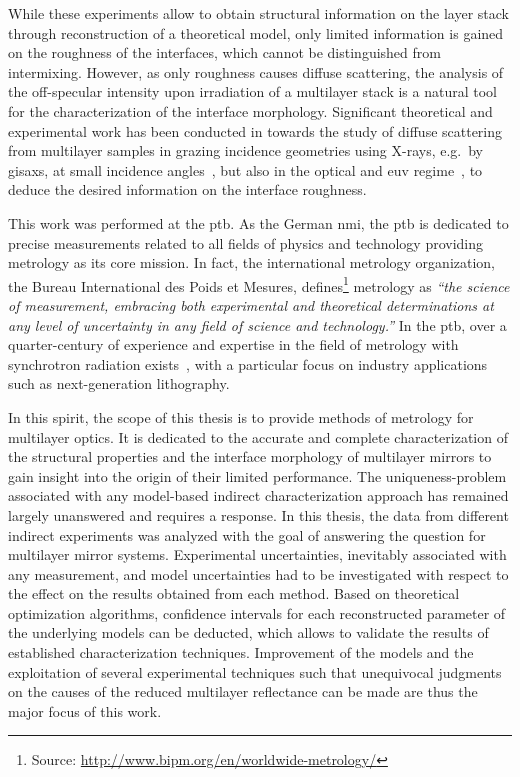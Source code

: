 While these experiments allow to obtain structural information on the layer
stack through reconstruction of a theoretical model, only limited information is
gained on the roughness of the interfaces, which cannot be distinguished from
intermixing.
However, as only roughness causes diffuse scattering, the analysis of the
off-specular intensity upon irradiation of a multilayer stack is a natural tool
for the characterization of the interface morphology.
Significant theoretical and experimental work has been conducted in towards the
study of diffuse scattering from multilayer samples in grazing incidence
geometries using X-rays, e.g.~by \gls{gisaxs}, at small incidence
angles~\cite{mikulik_X-ray_1997, sinha_X-ray_1994, de_boer_X-ray_1995,
de_boer_X-ray_1996, salditt_kinetic_1994,
levine_grazing-incidence_1989,siffalovic_characterization_2009}, but also in the
optical and \gls{euv} regime~\cite{amra_light_1993, amra_light_1994,
elson_light_1980, elson_relationship_1983, schroder_angle-resolved_2011,
schroder_spectral_2014}, to deduce the desired information on the interface
roughness.

This work was performed at the \gls{ptb}.
As the German \gls{nmi}, the \gls{ptb} is dedicated to precise measurements
related to all fields of physics and technology providing metrology as its core
mission.
In fact, the international metrology organization, the Bureau International des
Poids et Mesures, defines\footnote{Source:
\url{http://www.bipm.org/en/worldwide-metrology/}} metrology as \emph{``the
science of measurement, embracing both experimental and theoretical
determinations at any level of uncertainty in any field of science and
technology.''}
In the \gls{ptb}, over a quarter-century of experience and expertise in the
field of metrology with synchrotron radiation
exists~\cite{beckhoff_quarter-century_2009}, with a particular focus on industry
applications such as next-generation lithography.

In this spirit, the scope of this thesis is to provide methods
of metrology for multilayer optics.
It is dedicated to the accurate and complete characterization of the structural
properties and the interface morphology of multilayer mirrors to gain insight
into the origin of their limited performance.
The uniqueness-problem associated with any model-based indirect characterization
approach has remained largely unanswered and requires a response.
In this thesis, the data from different indirect experiments was analyzed with
the goal of answering the question for multilayer mirror systems.
Experimental uncertainties, inevitably associated with any measurement, and
model uncertainties had to be investigated with respect to the effect on the
results obtained from each method.
Based on theoretical optimization algorithms, confidence intervals for each
reconstructed parameter of the underlying models can be deducted, which allows
to validate the results of established characterization techniques.
Improvement of the models and the exploitation of several experimental
techniques such that unequivocal judgments on the causes of the reduced
multilayer reflectance can be made are thus the major focus of this work.

